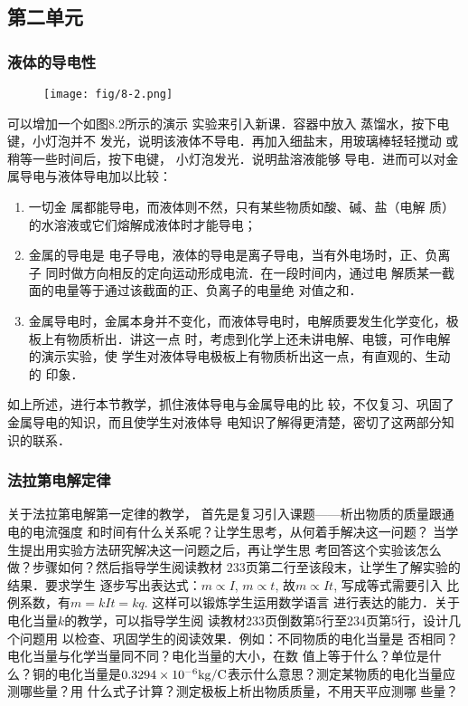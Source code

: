 \subsection{第二单元}
\subsubsection{液体的导电性}
\begin{figure}[htp]
    \centering
\texttt{[image: fig/8-2.png]}
    \caption{}
\end{figure}
可以增加一个如图8.2所示的演示
实验来引入新课．容器中放入
蒸馏水，按下电键，小灯泡并不
发光，说明该液体不导电．再加入细盐末，用玻璃棒轻轻搅动
或稍等一些时间后，按下电键，
小灯泡发光．说明盐溶液能够
导电．进而可以对金属导电与液体导电加以比较：
\begin{enumerate}
    \item 一切金
属都能导电，而液体则不然，只有某些物质如酸、碱、盐（电解
质）的水溶液或它们熔解成液体时才能导电；
\item 金属的导电是
电子导电，液体的导电是离子导电，当有外电场时，正、负离子
同时做方向相反的定向运动形成电流．在一段时间内，通过电
解质某一截面的电量等于通过该截面的正、负离子的电量绝
对值之和．
\item 金属导电时，金属本身并不变化，而液体导电时，电解质要发生化学变化，极板上有物质析出．讲这一点
时，考虑到化学上还未讲电解、电镀，可作电解的演示实验，使
学生对液体导电极板上有物质析出这一点，有直观的、生动的
印象．
\end{enumerate}

如上所述，进行本节教学，抓住液体导电与金属导电的比
较，不仅复习、巩固了金属导电的知识，而且使学生对液体导
电知识了解得更清楚，密切了这两部分知识的联系．

\subsubsection{法拉第电解定律}

关于法拉第电解第一定律的教学，
首先是复习引入课题——析出物质的质量跟通电的电流强度
和时间有什么关系呢？让学生思考，从何着手解决这一问题？
当学生提出用实验方法研究解决这一问题之后，再让学生思
考回答这个实验该怎么做？步骤如何？然后指导学生阅读教材
233页第二行至该段末，让学生了解实验的结果．要求学生
逐步写出表达式：$m\propto I$, $m\propto t$, 故$m\propto It$, 写成等式需要引入
比例系数，有$m=kIt=kq$. 这样可以锻炼学生运用数学语言
进行表达的能力．关于电化当量$k$的教学，可以指导学生阅
读教材233页倒数第5行至234页第5行，设计几个问题用
以检查、巩固学生的阅读效果．例如：不同物质的电化当量是
否相同？电化当量与化学当量同不同？电化当量的大小，在数
值上等于什么？单位是什么？铜的电化当量是$0.3294\times10^{-6}{\rm kg/C}$表示什么意思？测定某物质的电化当量应测哪些量？用
什么式子计算？测定极板上析出物质质量，不用天平应测哪
些量？


